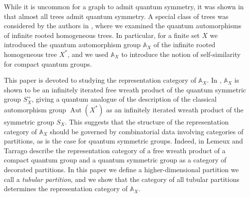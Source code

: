 \documentclass[12pt, a4paper]{amsart}
\def\Aut{\operatorname{Aut}}
\def\A{\mathbb{A}}
\theoremstyle{definition}
\theoremstyle{remark}
\numberwithin{equation}{section}
\begin{document}
While it is uncommon for a graph to admit quantum symmetry, it was shown in \cite{JSW2020} that almost all trees admit quantum symmetry. A special class of trees was considered by the authors in \cite{BR2025}, where we examined the quantum automorphisms of infinite rooted homogeneous trees. In particular, for a finite set $X$ we introduced the quantum automorphism group $\A_X$ of the infinite rooted homogeneous tree $X^*$,  and we used $\A_X$ to introduce the notion of self-similarity for compact quantum groups.  

%

This paper is devoted to studying the representation category of $\A_X$. In \cite{BR2025}, $\A_X$ is shown to be an infinitely iterated free wreath product of the quantum symmetric group $S_X^+$, giving a quantum analogue of the description of the classical automorphism group $\Aut(X^*)$ as an infinitely iterated wreath product of the symmetric group $S_X$. This suggests that the structure of the representation category of $\A_X$ should be governed by combinatorial data involving categories of partitions, as is the case for quantum symmetric groups. Indeed, in \cite{LT2016} Lemeux and Tarrago describe the representation category of a free wreath product of a compact quantum group and a quantum symmetric group as a category of decorated partitions. In this paper we define a higher-dimensional partition we call a \emph{tubular partition}, and we show that the category of all tubular partitions determines the representation category of $\A_X$.
\end{document}
